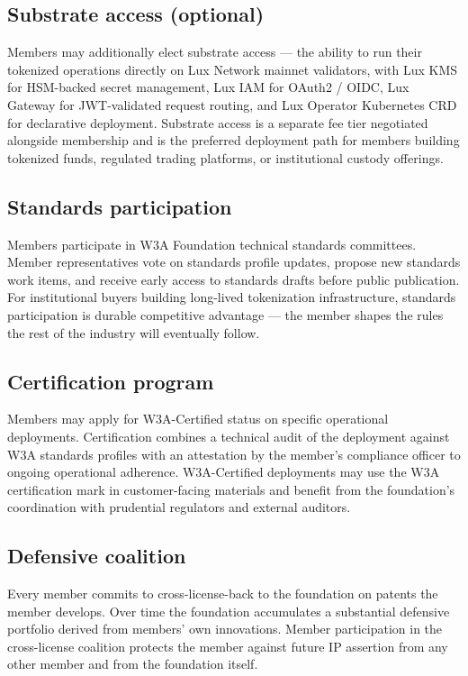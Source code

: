 \documentclass[11pt,letterpaper]{article}
\begin{document}
\subsection{Substrate access (optional)}

Members may additionally elect substrate access --- the ability to run their tokenized operations directly on Lux Network mainnet validators, with Lux KMS for HSM-backed secret management, Lux IAM for OAuth2 / OIDC, Lux Gateway for JWT-validated request routing, and Lux Operator Kubernetes CRD for declarative deployment. Substrate access is a separate fee tier negotiated alongside membership and is the preferred deployment path for members building tokenized funds, regulated trading platforms, or institutional custody offerings.

\subsection{Standards participation}

Members participate in W3A Foundation technical standards committees. Member representatives vote on standards profile updates, propose new standards work items, and receive early access to standards drafts before public publication. For institutional buyers building long-lived tokenization infrastructure, standards participation is durable competitive advantage --- the member shapes the rules the rest of the industry will eventually follow.

\subsection{Certification program}

Members may apply for W3A-Certified status on specific operational deployments. Certification combines a technical audit of the deployment against W3A standards profiles with an attestation by the member's compliance officer to ongoing operational adherence. W3A-Certified deployments may use the W3A certification mark in customer-facing materials and benefit from the foundation's coordination with prudential regulators and external auditors.

\subsection{Defensive coalition}

Every member commits to cross-license-back to the foundation on patents the member develops. Over time the foundation accumulates a substantial defensive portfolio derived from members' own innovations. Member participation in the cross-license coalition protects the member against future IP assertion from any other member and from the foundation itself.
\end{document}
